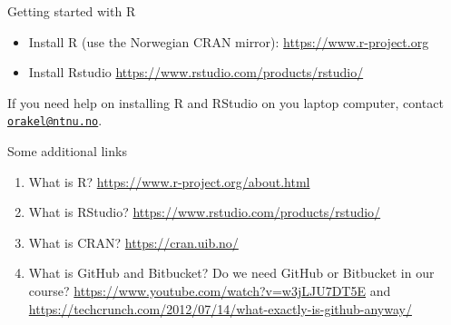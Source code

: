 \documentclass[10pt,ignorenonframetext,]{beamer}
\providecommand{\tightlist}{%
  \setlength{\itemsep}{0pt}\setlength{\parskip}{0pt}}
\begin{document}
\begin{frame}{Getting started with R}
\protect\hypertarget{getting-started-with-r}{}

\vspace{2mm}

\begin{itemize}
\tightlist
\item
  Install R (use the Norwegian CRAN mirror):
  \url{https://www.r-project.org}
\end{itemize}

\vspace{2mm}

\begin{itemize}
\tightlist
\item
  Install Rstudio \url{https://www.rstudio.com/products/rstudio/}
\end{itemize}

\vspace{4mm}

If you need help on installing R and RStudio on you laptop computer,
contact \href{mailto:orakel@ntnu.no}{\nolinkurl{orakel@ntnu.no}}.

\end{frame}

\begin{frame}

\begin{block}{Some additional links}

\vspace{4mm}

\begin{enumerate}
[1)]
\item
  What is R? \url{https://www.r-project.org/about.html} \vspace{2mm}
\item
  What is RStudio? \url{https://www.rstudio.com/products/rstudio/}
  \vspace{2mm}
\item
  What is CRAN? \url{https://cran.uib.no/} \vspace{2mm}
\item
  What is GitHub and Bitbucket? Do we need GitHub or Bitbucket in our
  course? \url{https://www.youtube.com/watch?v=w3jLJU7DT5E} and
  \url{https://techcrunch.com/2012/07/14/what-exactly-is-github-anyway/}
\end{enumerate}

\end{block}

\end{frame}
\end{document}
